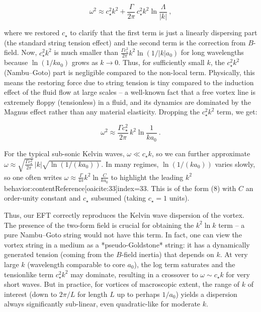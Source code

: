 \documentclass[12pt]{article}
\begin{document}
\[ \omega^2 \approx c_\star^2 k^2 + \frac{\Gamma}{2\pi}\, c_\star^2 k^2 \ln\frac{\Lambda}{|k|}~, \tag{10}\]

where we restored $c_\star$ to clarify that the first term is just a linearly dispersing part (the standard string tension effect) and the second term is the correction from $B$-field. Now, $c_\star^2 k^2$ is much smaller than $\frac{\Gamma c_\star^2}{2\pi} k^2 \ln(1/|k|a_0)$ for long wavelengths because $\ln(1/ka_0)$ grows as $k\to 0$. Thus, for sufficiently small $k$, the $c_\star^2 k^2$ (Nambu–Goto) part is negligible compared to the non-local term. Physically, this means the restoring force due to string tension is tiny compared to the induction effect of the fluid flow at large scales – a well-known fact that a free vortex line is extremely floppy (tensionless) in a fluid, and its dynamics are dominated by the Magnus effect rather than any material elasticity. Dropping the $c_\star^2 k^2$ term, we get:

\[ \omega^2 \approx \frac{\Gamma c_\star^2}{2\pi}\, k^2 \ln\frac{1}{k a_0}~. \tag{11} \]

For the typical sub-sonic Kelvin waves, $\omega \ll c_\star k$, so we can further approximate $\omega \approx \sqrt{\frac{\Gamma c_\star^2}{2\pi}}\, |k| \sqrt{\ln(1/(k a_0))}$. In many regimes, $\ln(1/(k a_0))$ varies slowly, so one often writes $\omega \approx \frac{\Gamma}{4\pi} k^2 \ln\frac{C}{k a_0}$ to highlight the leading $k^2$ behavior:contentReference[oaicite:33]{index=33}. This is of the form (8) with $C$ an order-unity constant and $c_\star$ subsumed (taking $c_\star=1$ units). 

Thus, our EFT correctly reproduces the Kelvin wave dispersion of the vortex. The presence of the two-form field is crucial for obtaining the $k^2 \ln k$ term – a pure Nambu–Goto string would not have this term. In fact, one can view the vortex string in a medium as a *pseudo-Goldstone* string: it has a dynamically generated tension (coming from the $B$-field inertia) that depends on $k$. At very large $k$ (wavelength comparable to core $a_0$), the log term saturates and the tensionlike term $c_\star^2 k^2$ may dominate, resulting in a crossover to $\omega \sim c_\star k$ for very short waves. But in practice, for vortices of macroscopic extent, the range of $k$ of interest (down to $2\pi/L$ for length $L$ up to perhaps $1/a_0$) yields a dispersion always significantly sub-linear, even quadratic-like for moderate $k$. 
\end{document}
